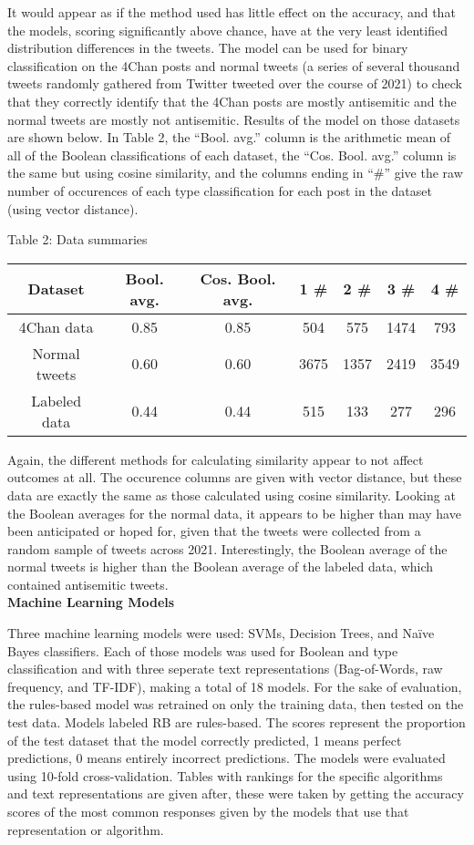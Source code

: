 \documentclass{article}
\begin{document}
It would appear as if the method used has little effect on the accuracy, and that the models, scoring significantly above chance, have at the very least identified distribution differences in the tweets. The model can be used for binary classification on the 4Chan posts and normal tweets (a series of several thousand tweets randomly gathered from Twitter tweeted over the course of 2021) to check that they correctly identify that the 4Chan posts are mostly antisemitic and the normal tweets are mostly not antisemitic. Results of the model on those datasets are shown below. In Table 2, the ``Bool. avg.'' column is the arithmetic mean of all of the Boolean classifications of each dataset, the ``Cos. Bool. avg.'' column is the same but using cosine similarity, and the columns ending in ``\#'' give the raw number of occurences of each type classification for each post in the dataset (using vector distance).
\begin{center}
Table 2: Data summaries\\
\begin{tabular}{ |c|c|c|c|c|c|c|}
\hline {\bf Dataset} & {\bf Bool. avg.} & {\bf Cos. Bool. avg.} & {\bf 1 \#} & {\bf 2 \#} & {\bf 3 \#} & {\bf 4 \#}\\
\hline 4Chan data & 0.85 & 0.85 & 504 & 575 & 1474 & 793\\
\hline Normal tweets & 0.60 & 0.60 & 3675 & 1357 & 2419 & 3549\\
\hline Labeled data & 0.44 & 0.44 & 515 & 133 & 277 & 296\\
\hline
\end{tabular}
\end{center}

Again, the different methods for calculating similarity appear to not affect outcomes at all. The occurence columns are given with vector distance, but these data are exactly the same as those calculated using cosine similarity. Looking at the Boolean averages for the normal data, it appears to be higher than may have been anticipated or hoped for, given that the tweets were collected from a random sample of tweets across 2021. Interestingly, the Boolean average of the normal tweets is higher than the Boolean average of the labeled data, which contained antisemitic tweets.\\

{\bf Machine Learning Models}

Three machine learning models were used: SVMs, Decision Trees, and Naïve Bayes classifiers. Each of those models was used for Boolean and type classification and with three seperate text representations (Bag-of-Words, raw frequency, and TF-IDF), making a total of 18 models. For the sake of evaluation, the rules-based model was retrained on only the training data, then tested on the test data. Models labeled RB are rules-based. The scores represent the proportion of the test dataset that the model correctly predicted, 1 means perfect predictions, 0 means entirely incorrect predictions. The models were evaluated using 10-fold cross-validation. Tables with rankings for the specific algorithms and text representations are given after, these were taken by getting the accuracy scores of the most common responses given by the models that use that representation or algorithm.
\end{document}
